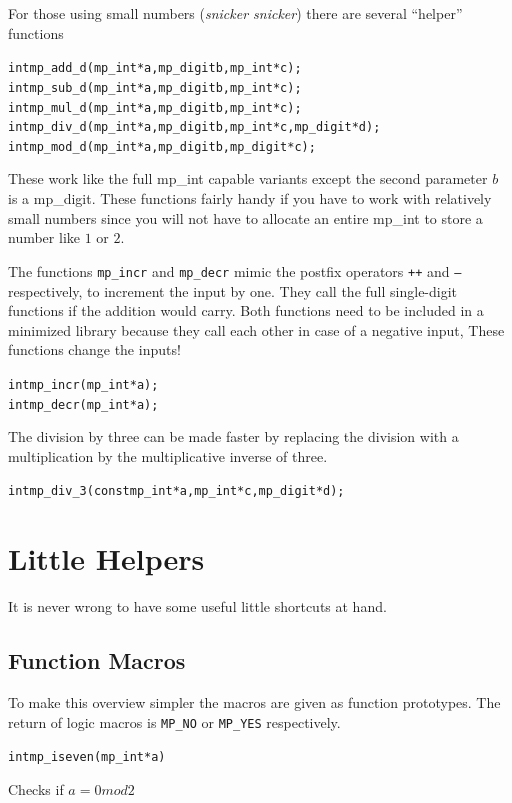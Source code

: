 \documentclass[synpaper]{book}
\begin{document}
For those using small numbers (\textit{snicker snicker}) there are several ``helper'' functions

    
\begin{alltt}
int mp_add_d(mp_int *a, mp_digit b, mp_int *c);
int mp_sub_d(mp_int *a, mp_digit b, mp_int *c);
int mp_mul_d(mp_int *a, mp_digit b, mp_int *c);
int mp_div_d(mp_int *a, mp_digit b, mp_int *c, mp_digit *d);
int mp_mod_d(mp_int *a, mp_digit b, mp_digit *c);
\end{alltt}

These work like the full mp\_int capable variants except the second parameter $b$ is a mp\_digit.  These
functions fairly handy if you have to work with relatively small numbers since you will not have to allocate
an entire mp\_int to store a number like $1$ or $2$.

The functions \texttt{mp\_incr} and \texttt{mp\_decr} mimic the postfix operators \texttt{++} and \texttt{--} respectively, to increment the input by one. They call the full single-digit functions if the addition would carry. Both functions need to be included in a minimized library because they call each other in case of a negative input, These functions change the inputs!
\begin{alltt}
int mp_incr(mp_int *a);
int mp_decr(mp_int *a);
\end{alltt}

The division by three can be made faster by replacing the division with a multiplication by the multiplicative inverse of three.

\begin{alltt}
int mp_div_3(const mp_int *a, mp_int *c, mp_digit *d);
\end{alltt}

\chapter{Little Helpers}
It is never wrong to have some useful little shortcuts at hand.
\section{Function Macros}
To make this overview simpler the macros are given as function prototypes. The return of logic macros is \texttt{MP\_NO} or \texttt{MP\_YES} respectively.

\begin{alltt}
int mp_iseven(mp_int *a)
\end{alltt}
Checks if $a = 0 mod 2$
\end{document}

